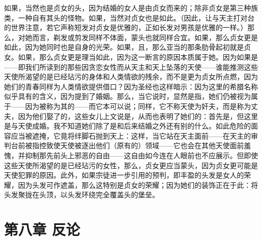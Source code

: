 如果，当然也是贞女的头，因为结婚的女人是由贞女而来的；除非贞女是第三种族类，一种自有其头的怪物。如果，当然对贞女也是如此。（因此，让与天主打对台的世界注意，若它声称短发对贞女是优雅的，正如长发对男孩是优雅的一样。）那么，对她而言，剃发或剪发同样不体面，蒙头也就同样合宜。如果，那么贞女更是如此，因为她同时也是自身的光荣。如果，且，那么亚当的那条肋骨起初就是贞女。如果，那么贞女更是理当如此，因为这一断言的原因本质属于她。因为如果是——即我们所读到的那些因贪恋女性而从天主和天上坠落的天使——谁能推测这些天使所渴望的是已经玷污的身体和人类情欲的残余，而不是更为贞女所点燃，因为她们的青春同样为人类情欲提供借口？因为圣经也这样暗示：因为这里的希腊名称似乎具有的含义，因为提到了婚姻。那么，当它说时，显然是指，她们仍被视为属于——因为被称为其的——而它本可以说；同样，它不称天使为奸夫，而是称为丈夫，因为他们娶了的，这些女儿上文说是，从而也表明了她们的：首先是，但这里是与天使成婚。我不知道她们除了是和后来结婚之外还有别的什么。如此危险的面容应当被遮掩，它竟将绊脚石抛到天上：这样，当它站在天主面前——在天主的审判台前被指控致使天使被逐出他们（原有的）领域——它也会在其他天使面前羞愧，并抑制那先前头上邪恶的自由——这自由如今连在人眼前也不应展示。但即使这些天使所渴望的是已经玷污的女性，那么，贞女更应当蒙头，因为贞女更可能是天使犯罪的原因。此外，如果宗徒进一步引用的预判，即丰盈的头发是女人的荣耀，因为头发可作遮盖，那么这特别是贞女的荣耀；因为她们的装饰正在于此：将头发聚拢在头顶，以头发环绕完全覆盖头的堡垒。\par


\section{第八章 反论}

